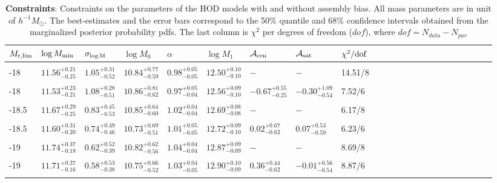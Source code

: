 \documentclass[twocolumn]{aastex61}
\newcommand{\mzero}{\log M_{0}}
\newcommand{\mone}{\log M_{1}}
\newcommand{\mmin}{\log M_{\rm min}}
\newcommand{\sigmam}{\sigma_{\log \rm M}}
\newcommand{\acen}{\mathcal{A}_{\rm cen}}
\newcommand{\asat}{\mathcal{A}_{\rm sat}}
\begin{document}
\begin{table}
\begin{center}
  \label{tab:constraints}
 \caption{{\bf Constraints}: Constraints on the parameters of the HOD models with and without assembly bias. 
All mass parameters are in unit of $h^{-1}M_\odot$. The best-estimates and the error bars correspond to the 50$\%$ quantile and 68$\%$ confidence intervals obtained from the marginalized posterior probability pdfs. The last column is $\chi^{2}$ per degrees of freedom ($dof$), where $dof = N_{data} - N_{par}$}
\begin{tabular}{@{}lllllllllllllllllllllll}
\hline 
   $M_{\rm r,lim}$ & $\mmin$ & $\sigmam$ & $\mzero$ & $\alpha$ &  $\mone$ & $\acen$ & $\asat$ & $\chi^{2}/\rm{dof}$ \\  \hline
  \\ 
 -18 & $11.56^{+0.21}_{-0.25}$ &  $1.05^{+0.31}_{-0.52}$ & $10.84^{+0.77}_{-0.59}$ & $0.98^{+0.05}_{-0.05}$ &  $12.50^{+0.10}_{-0.10}$ & $-$ & $-$ & 14.51/8\\\\
     
  -18 & $11.53^{+0.23}_{-0.21}$ &  $1.08^{+0.28}_{-0.51}$ & $10.86^{+0.81}_{-0.62}$ & $0.97^{+0.05}_{-0.04}$ &  $12.56^{+0.09}_{-0.10}$ & $-0.67^{+0.55}_{-0.25}$ & $-0.30^{+1.09}_{-0.54}$ & 7.52/6\\ \\
     
-18.5 & $11.67^{+0.29}_{-0.25}$ &  $0.83^{+0.45}_{-0.53}$ & $10.85^{+0.64}_{-0.60}$ & $1.02^{+0.04}_{-0.04}$ &  $12.69^{+0.08}_{-0.08}$ & $-$ & $-$ & 6.17/8\\ \\
    
-18.5 & $11.60^{+0.31}_{-0.20}$ &  $0.74^{+0.49}_{-0.46}$ & $10.73^{+0.69}_{-0.51}$ & $1.01^{+0.05}_{-0.05}$ &  $12.72^{+0.09}_{-0.10}$ & $0.02^{+0.67}_{-0.62}$ & $0.07^{+0.53}_{-0.59}$ & 6.23/6\\ \\

-19 & $11.74^{+0.37}_{-0.18}$ &  $0.62^{+0.52}_{-0.39}$ & $10.82^{+0.62}_{-0.56}$ & $1.04^{+0.04}_{-0.04}$ &  $12.87^{+0.09}_{-0.09}$ & $-$ & $-$ & 8.69/8\\ \\

-19 & $11.71^{+0.37}_{-0.16}$ &  $0.58^{+0.53}_{-0.38}$ & $10.75^{+0.66}_{-0.52}$ & $1.03^{+0.04}_{-0.05}$ &  $12.90^{+0.10}_{-0.09}$ & $0.36^{+0.44}_{-0.62}$ & $-0.01^{+0.56}_{-0.54}$ & 8.87/6\\ \\


\end{tabular}
\end{center}
\end{table}
\end{document}
